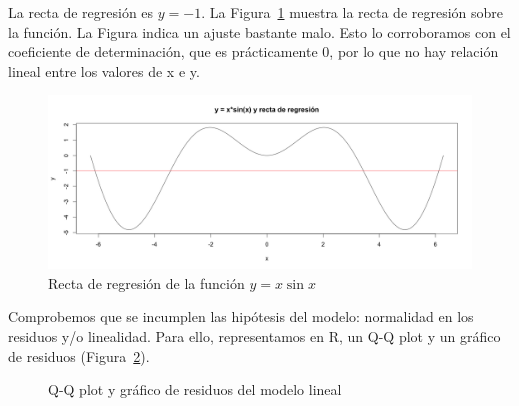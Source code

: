 \documentclass[12pt,a4paper,twoside,openright,titlepage,final]{article}
\begin{document}
La recta de regresión es $y=-1$. La Figura~\ref{fig:recta} muestra la recta de regresión sobre la función. La Figura indica un ajuste bastante malo. Esto lo corroboramos con el coeficiente de determinación, que es prácticamente 0, por lo que no hay relación lineal entre los valores de x e y.\\ 

\begin{figure}[tbph!]
\centering
\includegraphics[width=0.8\linewidth]{imagenes/recta}
\caption{Recta de regresión de la función $y=x\sin x$}
\label{fig:recta}
\end{figure}

Comprobemos que se incumplen las hipótesis del modelo: normalidad en los residuos y/o linealidad. Para ello, representamos en R, un Q-Q plot y un gráfico de residuos (Figura~\ref{fig:residuos}).\\

\begin{figure}[htbp!]
\centering
{}
\caption{Q-Q plot y gráfico de residuos del modelo lineal} \label{fig:residuos}
\end{figure}
\end{document}
